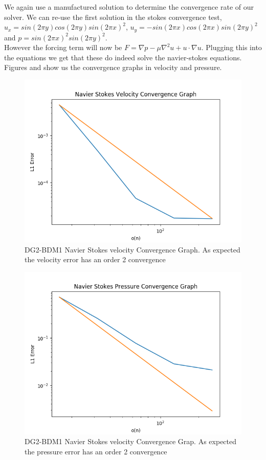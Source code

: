 \documentclass[11pt,twoside,a4paper]{article}
\begin{document}
We again use a manufactured solution to determine the convergence rate of our solver.
We can re-use the first solution in the stokes convergence test, $u_x = sin(2 \pi y) cos(2 \pi y)sin(2 \pi x)^2$, $u_y= -sin(2 \pi x) cos(2 \pi x) sin(2 \pi y)^2$ and $p = sin(2 \pi x)^2 sin(2 \pi y)^2$.\\
However the forcing term will now be $F = \nabla p - \mu \nabla^2 u + u \cdot \nabla u$.
Plugging this into the equations we get that these do indeed solve the navier-stokes equations.\\
Figures and show us the convergence graphs in velocity and pressure.\\

\begin{figure}
  \includegraphics[width=\linewidth]{navier_stokes_convergence_dbc0.png}
  \caption{DG2-BDM1 Navier Stokes velocity Convergence Graph. As expected the velocity error has an order 2 convergence}
\end{figure}

\begin{figure}
\includegraphics[width=\linewidth]{navier_stokes_pressure_convergence_dbc0.png}
  \caption{DG2-BDM1 Navier Stokes velocity Convergence Grap. As expected the pressure error has an order 2 convergence}
\end{figure}
\end{document}
